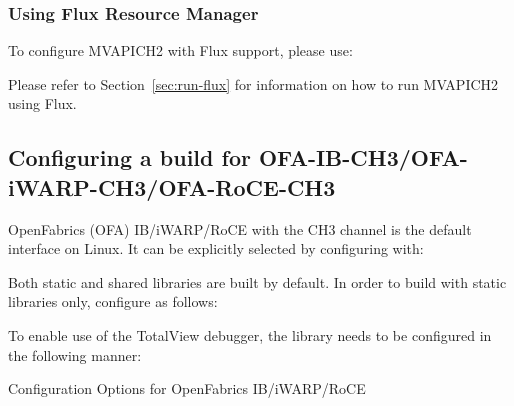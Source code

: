 \subsubsection{Using Flux Resource Manager}
\label{subsec:config-flux}

To configure MVAPICH2 with Flux support, please use:


Please refer to Section~\ref{sec:run-flux} for information on how to run MVAPICH2
using Flux.

\subsection{Configuring a build for OFA-IB-CH3/OFA-iWARP-CH3/OFA-RoCE-CH3}
\label{subsec:config-gen2}


OpenFabrics (OFA) IB/iWARP/RoCE with the CH3 channel
is the default interface on Linux.  
It can be explicitly selected by configuring with:


Both static and shared libraries are built by default. In order to build with static libraries only, configure as follows:


To enable use of the TotalView debugger, the library needs to be configured
in the following manner:


Configuration Options for OpenFabrics IB/iWARP/RoCE

